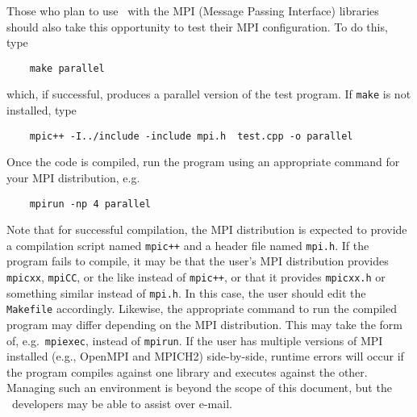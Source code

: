 Those who plan to use \MMSP\ with the MPI (Message Passing Interface) libraries should also take this opportunity to test their MPI configuration.  To do this, type
\begin{shadebox}
\begin{verbatim}
    make parallel
\end{verbatim}
\end{shadebox}
which, if successful, produces a parallel version of the test program.
If {\tt make} is not installed, type
\begin{shadebox}
\begin{verbatim}
    mpic++ -I../include -include mpi.h  test.cpp -o parallel
\end{verbatim}
\end{shadebox}
Once the code is compiled, run the program using an appropriate command for your MPI distribution, e.g.  
\begin{shadebox}
\begin{verbatim}
    mpirun -np 4 parallel
\end{verbatim}
\end{shadebox}
Note that for successful compilation, the MPI distribution is expected to provide a compilation script named {\tt mpic++} and a header file named {\tt mpi.h}.  If the program fails to compile, it may be that the user's MPI distribution provides {\tt mpicxx}, {\tt mpiCC}, or the like instead of {\tt mpic++}, or that it provides {\tt mpicxx.h} or something similar instead of {\tt mpi.h}.  In this case, the user should edit the {\tt Makefile} accordingly.  Likewise, the appropriate command to run the compiled program may differ depending on the MPI distribution.  This may take the form of, e.g.\ {\tt mpiexec}, instead of {\tt mpirun}.  If the user has multiple versions of MPI installed (e.g., OpenMPI and MPICH2) side-by-side, runtime errors will occur if the program compiles against one library and executes against the other.  Managing such an environment is beyond the scope of this document, but the \MMSP\ developers may be able to assist over e-mail.

